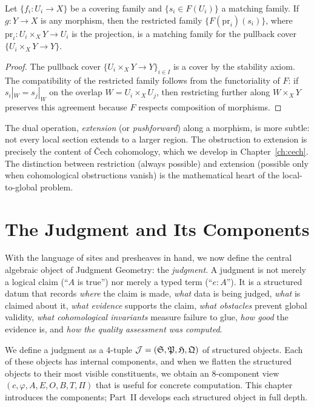 \begin{proposition}
\label{prop:restriction-compatibility}
Let $\{f_i : U_i \to X\}$ be a covering family and
$\{s_i \in F(U_i)\}$ a matching family.  If $g : Y \to X$ is any
morphism, then the restricted family $\{F(\mathrm{pr}_i)(s_i)\}$, where
$\mathrm{pr}_i : U_i \times_X Y \to U_i$ is the projection, is a matching
family for the pullback cover $\{U_i \times_X Y \to Y\}$.
\end{proposition}

\begin{proof}
The pullback cover $\{U_i \times_X Y \to Y\}_{i \in I}$ is a cover by
the stability axiom.  The compatibility of the restricted family follows
from the functoriality of $F$: if $s_i|_W = s_j|_W$ on the overlap
$W = U_i \times_X U_j$, then restricting further along $W \times_X Y$
preserves this agreement because $F$ respects composition of morphisms.
\end{proof}

\begin{remark}[Extension]
\label{rem:extension}
The dual operation, \emph{extension} (or \emph{pushforward}) along a
morphism, is more subtle: not every local section extends to a larger
region.  The obstruction to extension is precisely the content of
\v{C}ech cohomology, which we develop in Chapter~\ref{ch:cech}.
The distinction between restriction (always possible) and extension
(possible only when cohomological obstructions vanish) is the
mathematical heart of the local-to-global problem.
\end{remark}

\chapter{The Judgment and Its Components}
\label{ch:judgment}

With the language of sites and presheaves in hand, we now define the
central algebraic object of Judgment Geometry: the \emph{judgment}.
A judgment is not merely a logical claim (``$A$ is true'') nor merely
a typed term (``$e : A$'').  It is a structured datum that records
\emph{where} the claim is made, \emph{what} data is being judged,
\emph{what} is claimed about it, \emph{what evidence} supports the
claim, \emph{what obstacles} prevent global validity, \emph{what
cohomological invariants} measure failure to glue, \emph{how good}
the evidence is, and \emph{how the quality assessment was computed}.

We define a judgment as a 4-tuple $\mathcal{J} = (\mathfrak{S}, \mathfrak{P}, \mathfrak{H},
\mathfrak{Q})$ of structured objects.  Each of these objects has internal
components, and when we flatten the structured objects to their most
visible constituents, we obtain an 8-component view
$(c, \varphi, A, E, O, B, T, \Pi)$ that is useful for concrete
computation.  This chapter introduces the components; Part~II develops
each structured object in full depth.

